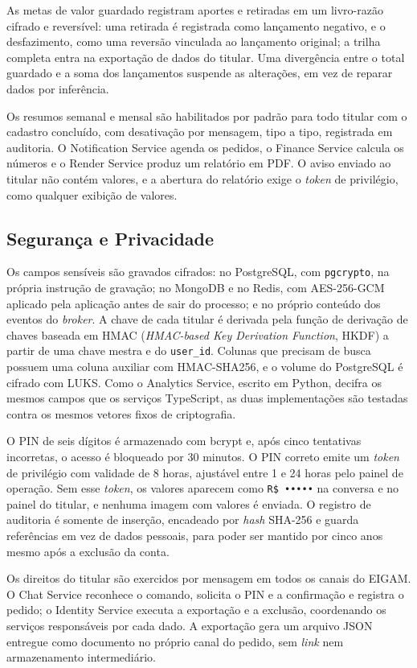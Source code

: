 As metas de valor guardado registram aportes e retiradas em um livro-razão cifrado e reversível: uma retirada é registrada como lançamento negativo, e o desfazimento, como uma reversão vinculada ao lançamento original; a trilha completa entra na exportação de dados do titular. Uma divergência entre o total guardado e a soma dos lançamentos suspende as alterações, em vez de reparar dados por inferência.

Os resumos semanal e mensal são habilitados por padrão para todo titular com o cadastro concluído, com desativação por mensagem, tipo a tipo, registrada em auditoria. O Notification Service agenda os pedidos, o Finance Service calcula os números e o Render Service produz um relatório em PDF. O aviso enviado ao titular não contém valores, e a abertura do relatório exige o \textit{token} de privilégio, como qualquer exibição de valores.

\subsection{Segurança e Privacidade}

Os campos sensíveis são gravados cifrados: no PostgreSQL, com \texttt{pgcrypto}, na própria instrução de gravação; no MongoDB e no Redis, com AES-256-GCM aplicado pela aplicação antes de sair do processo; e no próprio conteúdo dos eventos do \textit{broker}. A chave de cada titular é derivada pela função de derivação de chaves baseada em HMAC (\textit{HMAC-based Key Derivation Function}, HKDF) a partir de uma chave mestra e do \texttt{user\_id}. Colunas que precisam de busca possuem uma coluna auxiliar com HMAC-SHA256, e o volume do PostgreSQL é cifrado com LUKS. Como o Analytics Service, escrito em Python, decifra os mesmos campos que os serviços TypeScript, as duas implementações são testadas contra os mesmos vetores fixos de criptografia.

O PIN de seis dígitos é armazenado com bcrypt e, após cinco tentativas incorretas, o acesso é bloqueado por 30 minutos. O PIN correto emite um \textit{token} de privilégio com validade de 8 horas, ajustável entre 1 e 24 horas pelo painel de operação. Sem esse \textit{token}, os valores aparecem como \texttt{R\$ •••••} na conversa e no painel do titular, e nenhuma imagem com valores é enviada. O registro de auditoria é somente de inserção, encadeado por \textit{hash} SHA-256 e guarda referências em vez de dados pessoais, para poder ser mantido por cinco anos mesmo após a exclusão da conta.

Os direitos do titular são exercidos por mensagem em todos os canais do EIGAM. O Chat Service reconhece o comando, solicita o PIN e a confirmação e registra o pedido; o Identity Service executa a exportação e a exclusão, coordenando os serviços responsáveis por cada dado. A exportação gera um arquivo JSON entregue como documento no próprio canal do pedido, sem \textit{link} nem armazenamento intermediário.

